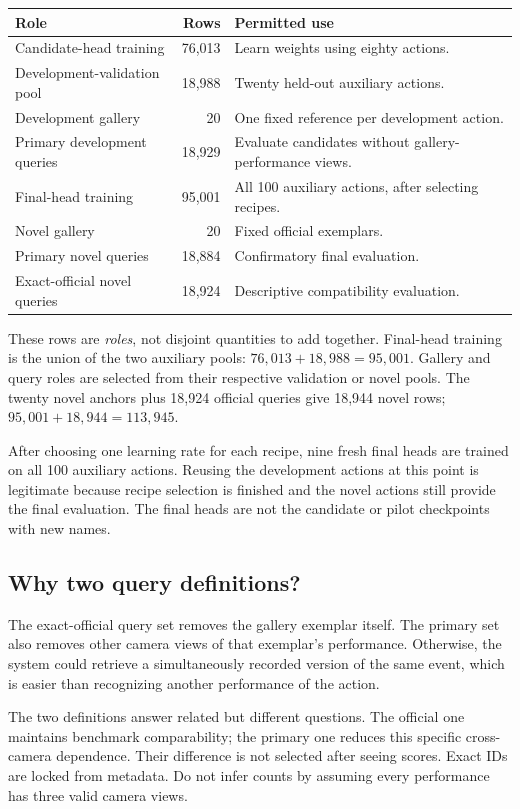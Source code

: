 \begin{tabularx}{\linewidth}{@{}Y r Y@{}}
\toprule
Role & Rows & Permitted use\\\midrule
Candidate-head training & 76,013 & Learn weights using eighty actions.\\
Development-validation pool & 18,988 & Twenty held-out auxiliary actions.\\
Development gallery & 20 & One fixed reference per development action.\\
Primary development queries & 18,929 & Evaluate candidates without gallery-performance views.\\
Final-head training & 95,001 & All 100 auxiliary actions, after selecting recipes.\\
Novel gallery & 20 & Fixed official exemplars.\\
Primary novel queries & 18,884 & Confirmatory final evaluation.\\
Exact-official novel queries & 18,924 & Descriptive compatibility evaluation.\\
\bottomrule
\end{tabularx}

These rows are \emph{roles}, not disjoint quantities to add together. Final-head
training is the union of the two auxiliary pools: $76{,}013+18{,}988=95{,}001$.
Gallery and query roles are selected from their respective validation or novel
pools. The twenty novel anchors plus 18,924 official queries give 18,944 novel
rows; $95{,}001+18{,}944=113{,}945$.

After choosing one learning rate for each recipe, nine fresh final heads are
trained on all 100 auxiliary actions. Reusing the development actions at this
point is legitimate because recipe selection is finished and the novel actions
still provide the final evaluation. The final heads are not the candidate or
pilot checkpoints with new names.

\subsection{Why two query definitions?}
The exact-official query set removes the gallery exemplar itself. The primary
set also removes other camera views of that exemplar's performance. Otherwise,
the system could retrieve a simultaneously recorded version of the same event,
which is easier than recognizing another performance of the action.

The two definitions answer related but different questions. The official one
maintains benchmark comparability; the primary one reduces this specific
cross-camera dependence. Their difference is not selected after seeing scores.
Exact IDs are locked from metadata. Do not infer counts by assuming every
performance has three valid camera views.


